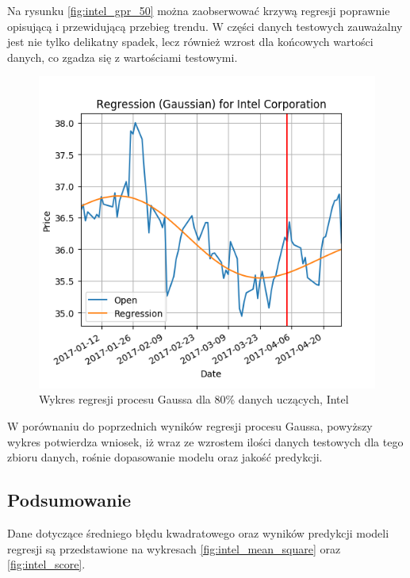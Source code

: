 Na rysunku \ref{fig:intel_gpr_50} można zaobserwować krzywą regresji poprawnie opisującą i przewidującą przebieg trendu.
W części danych testowych zauważalny jest nie tylko delikatny spadek, lecz również wzrost dla końcowych wartości danych, co zgadza się z wartościami testowymi.\\

\newpage

\begin{figure}[ht]
\centering
\includegraphics[scale=0.4]{pictures/plots/intel_gpr_80.png}
\caption{Wykres regresji procesu Gaussa dla 80\% danych uczących, Intel}
\label{fig:intel_gpr_80}
\end{figure}

W porównaniu do poprzednich wyników regresji procesu Gaussa, powyższy wykres potwierdza wniosek, iż wraz ze wzrostem ilości danych testowych dla tego zbioru danych, rośnie dopasowanie modelu oraz jakość predykcji.\\

\subsection{Podsumowanie}

Dane dotyczące średniego błędu kwadratowego oraz wyników predykcji modeli regresji są przedstawione na wykresach \ref{fig:intel_mean_square} oraz \ref{fig:intel_score}.\\

